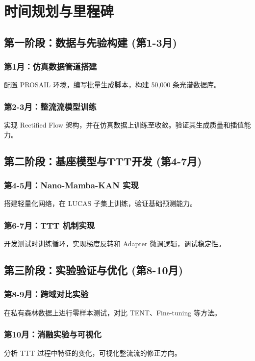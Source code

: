 \documentclass[12pt, a4paper]{article}
\begin{document}
\newpage
\section{时间规划与里程碑}

\subsection{第一阶段：数据与先验构建 (第1-3月)}

\subsubsection{第1月：仿真数据管道搭建}
配置 PROSAIL 环境，编写批量生成脚本，构建 50,000 条光谱数据库。
\subsubsection{第2-3月：整流流模型训练}
实现 Rectified Flow 架构，并在仿真数据上训练至收敛。验证其生成质量和插值能力。

\subsection{第二阶段：基座模型与TTT开发 (第4-7月)}
\subsubsection{第4-5月：Nano-Mamba-KAN 实现}
搭建轻量化网络，在 LUCAS 子集上训练，验证基础预测能力。
\subsubsection{第6-7月：TTT 机制实现}
开发测试时训练循环，实现梯度反转和 Adapter 微调逻辑，调试稳定性。

\subsection{第三阶段：实验验证与优化 (第8-10月)}
\subsubsection{第8-9月：跨域对比实验}
在私有森林数据上进行零样本测试，对比 TENT、Fine-tuning 等方法。
\subsubsection{第10月：消融实验与可视化}
分析 TTT 过程中特征的变化，可视化整流流的修正方向。
\end{document}
